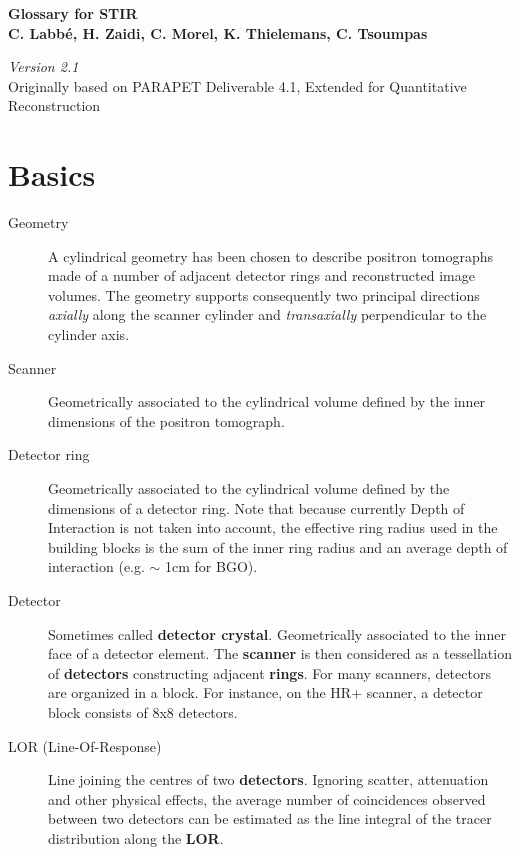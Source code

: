 \documentclass{article}
\begin{document}
\begin{center}
\textbf{{\huge Glossary for STIR}}\\
\textbf{C. Labb\'{e}, H. Zaidi, C. Morel, K. Thielemans, C. Tsoumpas}
\end{center}

\begin{center}
\textit{Version 2.1}\\
Originally based on PARAPET Deliverable 4.1,
Extended for Quantitative Reconstruction

\end{center}

\section*{Basics}

\begin{description}
\item[Geometry] 
A cylindrical geometry has been chosen to describe positron 
tomographs made of a number of adjacent detector rings and reconstructed 
image volumes. The geometry supports consequently two principal 
directions \textit{axially} along the scanner cylinder and \textit{transaxially} 
perpendicular to the cylinder axis.
\item[Scanner] 
Geometrically associated to the cylindrical volume defined by 
the inner dimensions of the positron tomograph.
\item[Detector ring ] 
Geometrically associated to the cylindrical volume defined by 
the dimensions of a detector ring. Note that because currently 
Depth of Interaction is not taken into account, the effective ring radius 
used in the building blocks is the sum of the inner ring radius 
and an average depth of interaction (e.g. \ensuremath{\sim} 1cm for BGO).
\item[Detector] 
Sometimes called \textbf{detector crystal}. Geometrically associated 
to the inner face of a detector element. The \textbf{scanner} is then 
considered as a tessellation of \textbf{detectors} constructing adjacent \textbf{rings}. 
For many scanners, detectors are organized in a block. For instance, 
on the HR+ scanner, a detector block consists of 8x8 detectors.
\item[LOR (Line-Of-Response)] 
Line joining the centres of two \textbf{detectors}. Ignoring scatter, 
attenuation and other physical effects, the average number of 
coincidences observed between two detectors can be estimated 
as the line integral of the tracer distribution along the \textbf{LOR}. 

\end{description}
\end{document}
